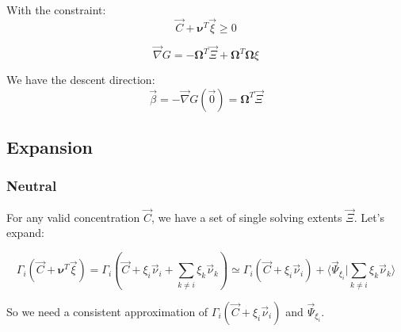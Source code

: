 \documentclass[aps,12pt]{revtex4}
\begin{document}
With the constraint:
\begin{equation}
	\vec{C} + \bm{\nu}^T \vec{\xi} \geq 0
\end{equation}

\begin{equation}
	\vec{\nabla} G = -\bm{\Omega}^T \vec{\Xi} + \bm{\Omega}^T \bm{\Omega} \xi
\end{equation}

We have the descent direction:
\begin{equation}
	\vec{\beta} = - \vec{\nabla}G(\vec{0}) = \bm{\Omega}^T \vec{\Xi}
\end{equation}

\subsection{Expansion}
\subsubsection{Neutral}
 
For any valid concentration $\vec{C}$, we have a set of single solving extents $\vec{\Xi}$.
Let's expand:

\begin{equation}
\Gamma_i(\vec{C} + \bm{\nu}^T \vec{\xi}) =  \Gamma_i(\vec{C} + \xi_i \vec{\nu}_i + \sum_{k\not=i} \xi_k \vec{\nu}_k)
\simeq \Gamma_i(\vec{C} + \xi_i \vec{\nu}_i) + \langle \vec{\Psi}_{\xi_i} \vert \sum_{k\not=i} \xi_k \vec{\nu}_k \rangle
\end{equation}

So we need a consistent approximation of $\Gamma_i(\vec{C} + \xi_i \vec{\nu}_i)$ and $\vec{\Psi}_{\xi_i}$.
\end{document}
